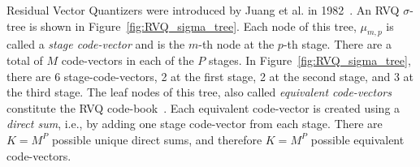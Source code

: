 \documentclass{article}
\begin{document}



Residual Vector Quantizers were introduced by Juang et al. in 1982~\cite{1982_CNF_SpeechRVQ_JuangGray}.   An RVQ $\sigma$-tree is shown in Figure~\ref{fig:RVQ_sigma_tree}.  Each node of this tree, $\mu_{m,p}$ is called a \emph{stage code-vector} and is the $m$-th node at the $p$-th stage.  There are a total of $M$ code-vectors in each of the $P$ stages.  In Figure~\ref{fig:RVQ_sigma_tree}, there are 6 stage-code-vectors, 2 at the first stage, 2 at the second stage, and 3 at the third stage.  The leaf nodes of this tree, also called \emph{equivalent code-vectors} constitute the RVQ code-book~\cite{2007_JNL_IDDM_Barnes}.  Each equivalent code-vector is created using a \emph{direct sum}, i.e., by adding one stage code-vector from each stage.  There are $K=M^P$ possible unique direct sums, and therefore $K=M^P$ possible equivalent code-vectors.
\end{document}
